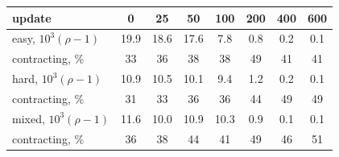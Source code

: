 \footnotesize
\setlength{\tabcolsep}{3pt}
\begin{tabular}{@{}lccccccc@{}}
\toprule
update & 0 & 25 & 50 & 100 & 200 & 400 & 600 \\
\midrule
easy, $10^3(\rho - 1)$ & 19.9 & 18.6 & 17.6 & 7.8 & 0.8 & 0.2 & 0.1 \\
\quad contracting, \% & 33 & 36 & 38 & 38 & 49 & 41 & 41 \\
hard, $10^3(\rho - 1)$ & 10.9 & 10.5 & 10.1 & 9.4 & 1.2 & 0.2 & 0.1 \\
\quad contracting, \% & 31 & 33 & 36 & 36 & 44 & 49 & 49 \\
mixed, $10^3(\rho - 1)$ & 11.6 & 10.0 & 10.9 & 10.3 & 0.9 & 0.1 & 0.1 \\
\quad contracting, \% & 36 & 38 & 44 & 41 & 49 & 46 & 51 \\
\bottomrule
\end{tabular}